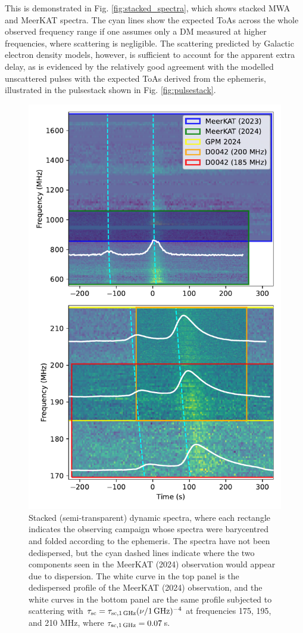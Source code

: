 \documentclass[fleqn,usenatbib]{mnras}
\begin{document}
This is demonstrated in Fig. \ref{fig:stacked_spectra}, which shows stacked MWA and MeerKAT spectra.
The cyan lines show the expected ToAs across the whole observed frequency range if one assumes only a DM measured at higher frequencies, where scattering is negligible.
The scattering predicted by Galactic electron density models, however, is sufficient to account for the apparent extra delay, as is evidenced by the relatively good agreement with the modelled unscattered pulses with the expected ToAs derived from the ephemeris, illustrated in the pulsestack shown in Fig. \ref{fig:pulsestack}.

\begin{figure}[th]
      \centering
          \includegraphics[width=0.95\linewidth]{stacked_spectra.pdf}
              \caption{Stacked (semi-transparent) dynamic spectra, where each rectangle indicates the observing campaign whose spectra were barycentred and folded according to the ephemeris. The spectra have not been dedispersed, but the cyan dashed lines indicate where the two components seen in the MeerKAT (2024) observation would appear due to dispersion. The white curve in the top panel is the dedispersed profile of the MeerKAT (2024) observation, and the white curves in the bottom panel are the same profile subjected to scattering with $\tau_{\rm sc} = \tau_{\rm sc,1\,GHz} (\nu/{\rm 1\,GHz})^{-4}$ at frequencies 175, 195, and 210 MHz, where $\tau_{\rm sc,1\,GHz} = 0.07\,$s.}

\end{figure}
\end{document}

